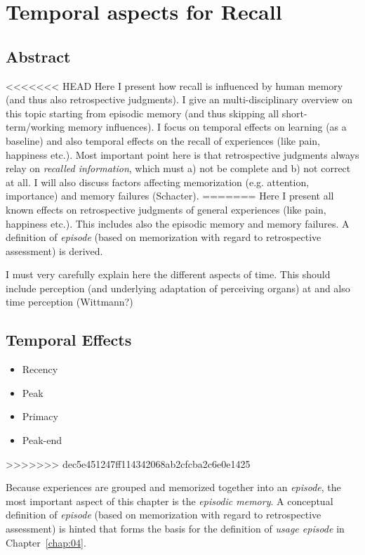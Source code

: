 \chapter{Temporal aspects for Recall}\label{chap:03}
\section*{Abstract}
<<<<<<< HEAD
Here I present how recall is influenced by human memory (and thus also retrospective judgments).
I give an multi-disciplinary overview on this topic starting from episodic memory (and thus skipping all short-term/working memory influences).
I focus on temporal effects on learning (as a baseline) and also temporal effects on the recall of experiences (like pain, happiness etc.).
Most important point here is that retrospective judgments always relay on \textit{recalled information}, which must a) not be complete and b) not correct at all.
I will also discuss factors affecting memorization (e.g. attention, importance) and memory failures (Schacter).
=======
Here I present all known effects on retrospective judgments of general experiences (like pain, happiness etc.).
This includes also the episodic memory and memory failures.
A definition of \emph{episode} (based on memorization with regard to retrospective assessment) is derived.

I must very carefully explain here the different aspects of time.
This should include perception (and underlying adaptation of perceiving organs) at and also time perception (Wittmann?)

\section{Temporal Effects}
\begin{itemize}
\item Recency
\item Peak
\item Primacy
\item Peak-end
\end{itemize}
>>>>>>> dec5e451247ff114342068ab2cfcba2c6e0e1425

Because experiences are grouped and memorized together into an \textit{episode}, the most important aspect of this chapter is the \textit{episodic memory}.
A conceptual definition of \emph{episode} (based on memorization with regard to retrospective assessment) is hinted that forms the basis for the definition of \textit{usage episode} in Chapter~\ref{chap:04}.

